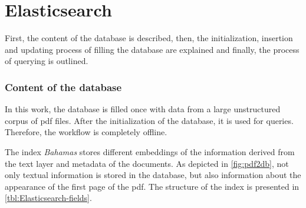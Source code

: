 
\section{Elasticsearch}\label{subsec:impl-db}
First, the content of the database is described, then, the initialization, insertion and updating process of filling the database are explained 
and finally, the process of querying is outlined.

\subsubsection*{Content of the database}
In this work, the database is filled once with data from a large unstructured corpus of \ac{pdf} files.
After the initialization of the database, it is used for queries. 
Therefore, the workflow is completely offline.

The index \textit{Bahamas} stores different embeddings of the information derived from the text layer and metadata of the documents.
As depicted in \autoref{fig:pdf2db}, not only textual information is stored in the database, 
but also information about the appearance of the first page of the \ac{pdf}.
The structure of the index is presented in \autoref{tbl:Elasticsearch-fields}.

